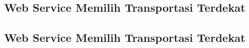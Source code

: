 \subsection{Web Service Memilih Transportasi Terdekat}
\label{subsec:Service Memilih Transportasi Terdekat}

\subsection{Web Service Memilih Transportasi Terdekat}
\label{subsec:Service Memilih Transportasi Terdekat}